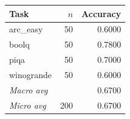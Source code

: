 \begin{tabular}{lrr}
\toprule
Task & $n$ & Accuracy \\
\midrule
arc\_easy & 50 & 0.6000 \\
boolq & 50 & 0.7800 \\
piqa & 50 & 0.7000 \\
winogrande & 50 & 0.6000 \\
\midrule
\textit{Macro avg} & & 0.6700 \\
\textit{Micro avg} & 200 & 0.6700 \\
\bottomrule
\end{tabular}

